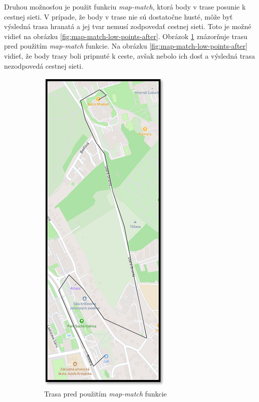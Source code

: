 Druhou možnosťou je použit funkciu \textit{map-match}, ktorá body v trase posunie k cestnej sieti. V prípade, že body v trase nie sú dostatočne husté, môže byť výsledná trasa hranatá a jej tvar nemusí zodpovedať cestnej sieti. Toto je možné vidieť na obrázku \ref{fig:map-match-low-points-after}. Obrázok \ref{fig:map-match-low-points-before} znázorňuje trasu pred použitím \textit{map-match} funkcie. Na obrázku \ref{fig:map-match-low-points-after} vidieť, že body trasy boli pripnuté k ceste, avšak nebolo ich dosť a výsledná trasa nezodpovedá cestnej sieti.

\begin{figure}[H]
    \centering
    \begin{subfigure}{0.45\textwidth}
        \centering
        \includegraphics[width=.5\textwidth]{img/map-match rozdiel/malo bodov pred.png}
        \caption{Trasa pred použitím \textit{map-match} funkcie}
        \label{fig:map-match-low-points-before}
    \end{subfigure}
    \begin{subfigure}{0.45\textwidth}

\end{subfigure}
\end{figure}
